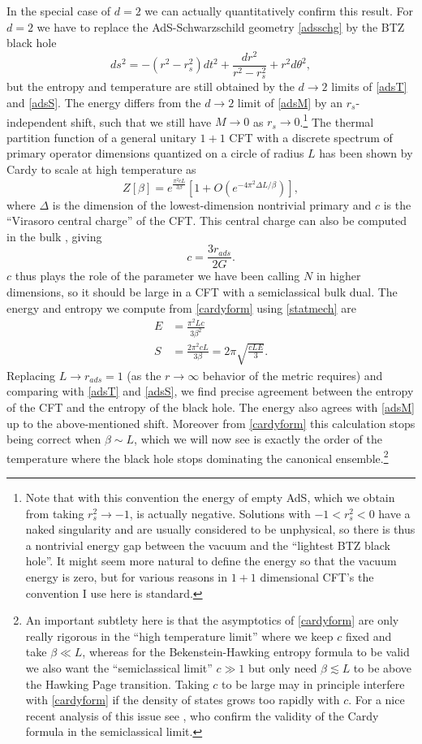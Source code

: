 \documentclass[12pt]{article}
\newcommand{\be}{\begin{equation}}
\newcommand{\ee}{\end{equation}}
\begin{document}
In the special case of $d=2$ we can actually quantitatively confirm this result.  For $d=2$ we have to replace the AdS-Schwarzschild geometry \eqref{adsschg} by the BTZ black hole \cite{Banados:1992wn}
\be
ds^2=-(r^2-r_s^2)dt^2+\frac{dr^2}{r^2-r_s^2}+r^2d\theta^2,
\ee
but the entropy and temperature are still obtained by the $d\to 2$ limits of \eqref{adsT} and \eqref{adsS}.  The energy differs from the $d\to 2$ limit of \eqref{adsM} by an $r_s$-independent shift, such that we still have $M\to 0$ as $r_s\to 0$.\footnote{Note that with this convention the energy of empty AdS, which we obtain from taking $r_s^2\to -1$, is actually negative.  Solutions with $-1<r_s^2<0$ have a naked singularity and are usually considered to be unphysical, so there is thus a nontrivial energy gap between the vacuum and the ``lightest BTZ black hole''.  It might seem more natural to define the energy so that the vacuum energy is zero, but for various reasons in $1+1$ dimensional CFT's the convention I use here is standard.}  The thermal partition function of a general unitary $1+1$ CFT with a discrete spectrum of primary operator dimensions quantized on a circle of radius $L$ has been shown by Cardy \cite{Cardy:1986ie} to scale at high temperature as
\be\label{cardyform}
Z[\beta]= e^{\frac{\pi^2 c L}{3\beta}}\left[1+O\left(e^{-4\pi^2 \Delta L/\beta}\right)\right],
\ee
where $\Delta$ is the dimension of the lowest-dimension nontrivial primary and $c$ is the ``Virasoro central charge'' of the CFT.  This central charge can also be computed in the bulk \cite{Brown:1986nw}, giving
\be
c=\frac{3 r_{ads}}{2G}.
\ee
$c$ thus plays the role of the parameter we have been calling $N$ in higher dimensions, so it should be large in a CFT with a semiclassical bulk dual.  The energy and entropy we compute from \eqref{cardyform} using \eqref{statmech} are 
\begin{align}\nonumber
E&=\frac{\pi^2 L c}{3\beta^2}\\
S&=\frac{2\pi^2 c L}{3\beta}=2\pi \sqrt{\frac{c LE}{3}}.
\end{align}
Replacing $L\to r_{ads}=1$ (as the $r\to\infty$ behavior of the metric requires) and comparing with \eqref{adsT} and \eqref{adsS}, we find precise agreement between the entropy of the CFT and the entropy of the black hole.  The energy also agrees with \eqref{adsM} up to the above-mentioned shift.  Moreover from \eqref{cardyform} this calculation stops being correct when $\beta\sim L$, which we will now see is exactly the order of the temperature where the black hole stops dominating the canonical ensemble.\footnote{An important subtlety here is that the asymptotics of \eqref{cardyform} are only really rigorous in the ``high temperature limit'' where we keep $c$ fixed and take $\beta \ll L$, whereas for the Bekenstein-Hawking entropy formula to be valid we also want the ``semiclassical limit'' $c\gg 1$ but only need $\beta \lesssim L$ to be above the Hawking Page transition.  Taking $c$ to be large may in principle interfere with \eqref{cardyform} if the density of states grows too rapidly with $c$.  For a nice recent analysis of this issue see \cite{Hartman:2014oaa}, who confirm the validity of the Cardy formula in the semiclassical limit.}  
\end{document}

